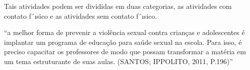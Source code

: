 









Tais atividades podem ser divididas em duas categorias, as atividades com contato f´ısico e as atividades sem contato f´ısico.

``a melhor forma de prevenir a violência sexual contra crianças e adolescentes é implantar um programa de educação para saúde sexual na escola. Para isso, é preciso capacitar os professores de modo que possam transformar a matéria em um tema estruturante de suas aulas. (SANTOS; IPPOLITO, 2011, P.196)'' %






